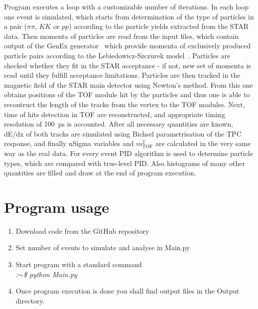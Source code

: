\documentclass[a4paper,11pt]{article}
\begin{document}
Program executes a loop with a customizable number of iterations. In each loop one event is simulated, which starts from determination of the type of particles in a pair ($\pi\pi$, $KK$ or $pp$) according to the particle yields extracted from the STAR data. Then momenta of particles are read from the input files, which contain output of the GenEx generator~\cite{3} which provide momenta of exclusively produced particle pairs according to the Lebiedowicz-Szczurek model~\cite{4}. Particles are checked whether they fit in the STAR acceptance - if not, new set of momenta is read until they fulfill acceptance limitations. Particles are then tracked in the magnetic field of the STAR main detector using Newton's method. From this one obtains positions of the TOF module hit by the particles and thus one is able to recontruct the length of the tracks from the vertex to the TOF modules. Next, time of hits detection in TOF are reconstructed, and appropriate timing resolution of 100~ps is accounted. After all necessary quantities are known, dE/dx of both tracks are simulated using Bichsel parametrisation of the TPC response, and finally nSigma variables and $m^{2}_{\textrm{TOF}}$ are calculated in the very same way as the real data.
For every event PID algorithm is used to determine particle types, which are compared with true-level PID. Also histograms of many other quantities are filled and draw at the end of program execution.


\section{Program usage}
\begin{enumerate}
\item Download code from the GitHub repository~\cite{1}\vspace*{-7pt}
\item Set number of events to simulate and analyse in Main.py\vspace*{-7pt}
\item Start program with a standard command\\ \textit{:$\sim$\$ python Main.py}\vspace*{-7pt}
\item Once program execution is done you shall find output files in the Output directory.
\end{enumerate}
\end{document}

